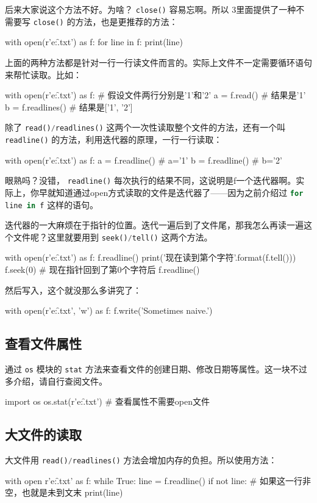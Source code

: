\documentclass[a4paper,12pt]{report}
\newcommand{\pyline}[1]{{ \lstinline[language=Python, basicstyle=\ttfamily]{#1} }}
\newcommand{\python}{{\ttfamily{Python}}}
\newcommand{\mytt}[1]{{\ttfamily{#1}}}
\begin{document}
后来大家说这个方法不好。为啥？\pyline{close()}容易忘啊。所以\python{} 3里面提供了一种不需要写\pyline{close()}的方法，也是更推荐的方法：
\begin{py}
with open(r'e:\f.txt') as f:
    for line in f:
        print(line)
\end{py}

上面的两种方法都是针对一行一行读文件而言的。实际上文件不一定需要循环语句来帮忙读取。比如：
\begin{py}
with open(r'e:\f.txt') as f: # 假设文件两行分别是'1'和'2'
    a = f.read() # 结果是'1'
    b = f.readlines() # 结果是['1\n', '2']
\end{py}

除了\pyline{read()/readlines()}这两个一次性读取整个文件的方法，还有一个叫\pyline{readline()}的方法，利用迭代器的原理，一行一行读取：
\begin{py}
with open(r'e:\f.txt') as f:
    a = f.readline() # a='1\n'
    b = f.readline() # b='2'
\end{py}

眼熟吗？没错，\pyline{readline()}每次执行的结果不同，这说明是f一个迭代器啊。实际上，你早就知道通过open方式读取的文件是迭代器了——因为之前介绍过\pyline{for line in f}这样的语句。

迭代器的一大麻烦在于指针的位置。迭代一遍后到了文件尾，那我怎么再读一遍这个文件呢？这里就要用到\pyline{seek()/tell()}这两个方法。
\begin{py}
with open(r'e:\f.txt') as f:
    f.readline()
    print('现在读到第{}个字符'.format(f.tell()))
    f.seek(0) # 现在指针回到了第0个字符后
    f.readline()
\end{py}

然后写入，这个就没那么多讲究了：
\begin{py}
with open(r'e:\f.txt', 'w') as f:
    f.write('Sometimes naive.')
\end{py}

\subsection{查看文件属性}
通过\pyline{os}模块的\pyline{stat}方法来查看文件的创建日期、修改日期等属性。这一块不过多介绍，请自行查阅文件。
\begin{py}
import os
os.stat(r'e:\f.txt') # 查看属性不需要open文件
\end{py}

\subsection{大文件的读取}
大文件用\pyline{read()/readlines()}方法会增加内存的负担。所以使用\mytt{readline()}方法：
\begin{py}
with open r'e:\f.txt' as f:
    while True:
        line = f.readline()
        if not line: # 如果这一行非空，也就是未到文末
            print(line)  
\end{py}
\end{document}
